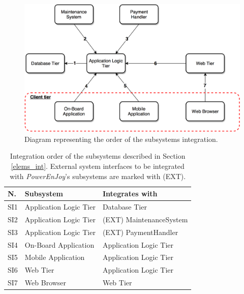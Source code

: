 \begin{figure}[H]
\begin{center}
		\includegraphics[width=\textwidth]{./integration_strategy/diagrams/h_level_subsys.png}
		\caption{Diagram representing the order of the subsystems integration.}
		\label{h_level_subsys}
\end{center}
\end{figure}

\begin{table}[H]
\begin{center}
\begin{tabular}{p{} | p{} | p{}}
\hline
\textbf{N.} & \textbf{Subsystem} & \textbf{Integrates with} \\
\hline
SI1 & Application Logic Tier & Database Tier \\
\hline
SI2 & Application Logic Tier & (EXT) MaintenanceSystem \\
\hline
SI3 & Application Logic Tier & (EXT) PaymentHandler \\
\hline
SI4 & On-Board Application & Application Logic Tier \\
\hline
SI5 & Mobile Application & Application Logic Tier \\
\hline
SI6 & Web Tier & Application Logic Tier \\
\hline
SI7 & Web Browser & Web Tier \\
\hline
\end{tabular}
\end{center}
\caption{Integration order of the subsystems described in Section \ref{elems_int}. External system interfaces to be integrated with \textit{PowerEnJoy}'s subsystems are marked with (EXT).}
\label{subsys_int}
\end{table}

